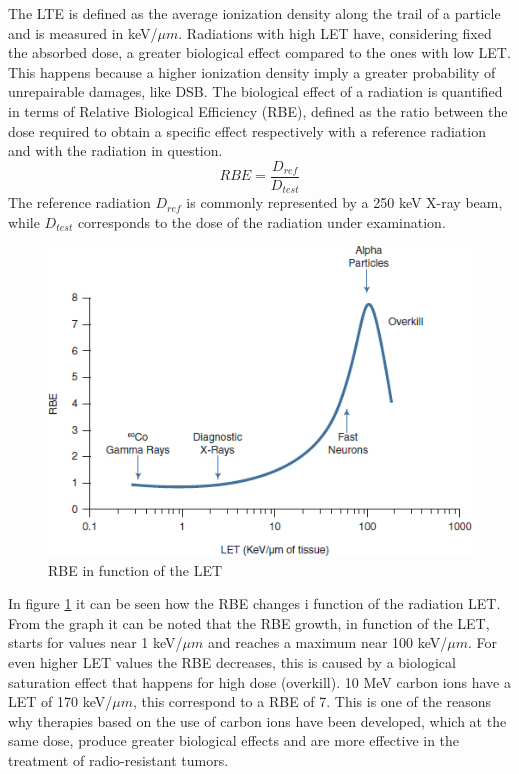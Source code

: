 \noindent The LTE is defined as the average ionization density along the trail of a particle and is measured in keV/$\mu m$.
Radiations with high LET have, considering fixed the absorbed dose, a greater biological effect compared to the ones with low LET.
This happens because a higher ionization density imply a greater probability of unrepairable damages, like DSB.
The biological effect of a radiation is quantified in terms of Relative Biological Efficiency (RBE), defined as the ratio between the dose required to obtain a specific effect respectively with a reference radiation and with the radiation in question.
\begin{equation}\label{eq:rbe}
	RBE=\frac{D_{ref}}{D_{test}}
\end{equation}
\noindent The reference radiation $D_{ref}$ is commonly represented by a 250 keV X-ray beam, while $D_{test}$ corresponds to the dose of the radiation under examination.
\begin{figure}[H]
	\centering
	\includegraphics[width=0.7\linewidth]{IMG/ch1/RBE}
	\caption{RBE in function of the LET}
	\label{fig:rbe}
\end{figure}
\noindent In figure \ref{fig:rbe} it can be seen how the RBE changes i function of the radiation LET. From the graph it can be noted that the RBE growth, in function of the LET, starts for values near 1 keV/$\mu m$ and reaches a maximum near 100 keV/$\mu m$. For even higher LET values the RBE decreases, this is caused by a biological saturation effect that happens for high dose (overkill). 
10 MeV carbon ions have a LET of 170 keV/$\mu m$, this correspond to a RBE of 7. This is one of the reasons why therapies based on the use of carbon ions have been developed, which at the same dose, produce greater biological effects and are more effective in the treatment of radio-resistant tumors.


